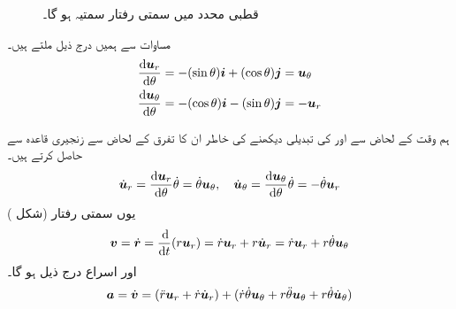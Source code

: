 \begin{figure}
\begin{minipage}{0.45\textwidth}
\caption{قطبی محدد میں سمتی رفتار سمتیہ  ہو گا۔}
\label{شکل_سمتی_تفاعل_سمتی_رفتار_سمتیہ}
\end{minipage}
\end{figure}

مساوات  سے ہمیں   درج ذیل ملتے ہیں۔
\begin{gather}
\begin{aligned}\label{مساوات_سمتی_تفاعل_قطبی_روپ_ب}
\frac{\dif\kvec{u}_r}{\dif \theta}&=-(\sin\theta)\ai+(\cos\theta)\aj=\kvec{u}_{\theta}\\
\frac{\dif\kvec{u}_{\theta}}{\dif\theta}&=-(\cos\theta)\ai-(\sin\theta)\aj=-\kvec{u}_r
\end{aligned}
\end{gather}

ہم  وقت کے لحاض سے  اور  کی تبدیلی دیکھنے کی خاطر ان  کا  تفرق  کے لحاض سے زنجیری قاعدہ  سے حاصل کرتے   ہیں۔
\begin{gather}
\begin{aligned}\label{مساوات_سمتی_تفاعل_قطبی_روپ_پ}
\dot{\kvec{u}}_r=\frac{\dif\kvec{u}_r}{\dif\theta}\dot{\theta}=\dot{\theta}\kvec{u}_{\theta},\quad\dot{\kvec{u}}_{\theta}=\frac{\dif\kvec{u}_{\theta}}{\dif\theta}\dot{\theta}=-\dot{\theta}\kvec{u}_r
\end{aligned}
\end{gather}
یوں سمتی رفتار (شکل )
\begin{align}\label{مساوات_سمتی_تفاعل_قطبی_روپ_ت}
\kvec{v}=\dot{\kvec{r}}=\frac{\dif}{\dif t}(r\kvec{u}_r)=\dot{r}\kvec{u}_r+r\dot{\kvec{u}}_r=\dot{r}\kvec{u}_r+r\dot{\theta}\kvec{u}_{\theta}
\end{align}
اور اسراع  درج  ذیل ہو گا۔
\begin{align}\label{مساوات_سمتی_تفاعل_قطبی_روپ_ٹ}
{\ensuremath{{\boldsymbol{a}}}}=\dot{{{\boldsymbol{v}}}}=(\ddot{r}{{\boldsymbol{u}}}_r+\dot{r}\dot{{{\boldsymbol{u}}}}_r)+(\dot{r}\dot{\theta}{{\boldsymbol{u}}}_{\theta}+r\ddot{\theta}{{\boldsymbol{u}}}_{\theta}+r\dot{\theta}\dot{{{\boldsymbol{u}}}}_{\theta})
\end{align}

